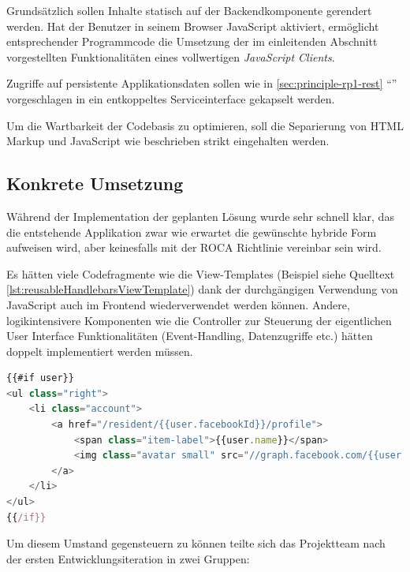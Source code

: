 Grundsätzlich sollen Inhalte statisch auf der Backendkomponente gerendert werden. Hat der Benutzer in seinem Browser JavaScript aktiviert, ermöglicht entsprechender Programmcode die Umsetzung der im einleitenden Abschnitt vorgestellten Funktionalitäten eines vollwertigen \emph{JavaScript Clients}.

Zugriffe auf persistente Applikationsdaten sollen wie in \ref{sec:principle-rp1-rest} ``'' vorgeschlagen in ein entkoppeltes Serviceinterface gekapselt werden.

Um die Wartbarkeit der Codebasis zu optimieren, soll die Separierung von HTML Markup und JavaScript wie beschrieben strikt eingehalten werden.


\subsection*{Konkrete Umsetzung}

Während der Implementation der geplanten Lösung wurde sehr schnell klar, das die entstehende Applikation zwar wie erwartet die gewünschte hybride Form aufweisen wird, aber keinesfalls mit der ROCA Richtlinie \emph{} vereinbar sein wird.

Es hätten viele Codefragmente wie die View-Templates (Beispiel siehe Quelltext \ref{lst:reusableHandlebarsViewTemplate}) dank der durchgängigen Verwendung von JavaScript auch im Frontend wiederverwendet werden können. Andere, logikintensivere Komponenten wie die Controller zur Steuerung der eigentlichen User Interface Funktionalitäten (Event-Handling, Datenzugriffe etc.) hätten doppelt implementiert werden müssen.

\begin{lstlisting}[language=JavaScript, firstnumber=31, caption={Ausschnitt aus dem \emph{Handlebars} \cite{Handlebars} Template zur Darstellung von Benutzerinformation in der Menüleiste von \emph{Roomies} \cite{roomiesMenuTemplate}}, label={lst:reusableHandlebarsViewTemplate}]
{{#if user}}
<ul class="right">
	<li class="account">
		<a href="/resident/{{user.facebookId}}/profile">
			<span class="item-label">{{user.name}}</span>
			<img class="avatar small" src="//graph.facebook.com/{{user.facebookId}}/picture" />
		</a>
	</li>
</ul>
{{/if}}
\end{lstlisting}

Um diesem Umstand gegensteuern zu können teilte sich das Projektteam nach der ersten Entwicklungsiteration in zwei Gruppen:

